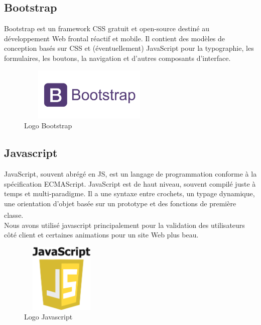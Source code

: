 \documentclass[12pt]{report}
\begin{document}
\newpage

\subsection{Bootstrap}

Bootstrap est un framework CSS gratuit et open-source destiné au développement Web frontal réactif et mobile. Il contient des modèles de conception basés sur CSS et (éventuellement) JavaScript pour la typographie, les formulaires, les boutons, la navigation et d'autres composants d'interface.

\vspace{-0.1in}

\begin{figure}[h]
\centering
    \includegraphics[width = 2.7in, height = 1in]{../Images/Bootstrap.png}
\vspace{-0.2in}
\caption{Logo Bootstrap}
\end{figure}

\vspace*{-0.3in}

\subsection{Javascript}

JavaScript, souvent abrégé en JS, est un langage de programmation conforme à la spécification ECMAScript. JavaScript est de haut niveau, souvent compilé juste à temps et multi-paradigme. Il a une syntaxe entre crochets, un typage dynamique, une orientation d'objet basée sur un prototype et des fonctions de première classe.\textsuperscript{\cite{robbins2012learning}\cite{osmani2012learning}}
\\
Nous avons utilisé javascript principalement pour la validation des utilisateurs côté client et certaines animations pour un site Web plus beau.

\begin{figure}[h]
\centering
    \includegraphics[width = 1.55in, height = 1.3in]{../Images/JS.png}
\caption{Logo Javascript}
\end{figure}
\end{document}
